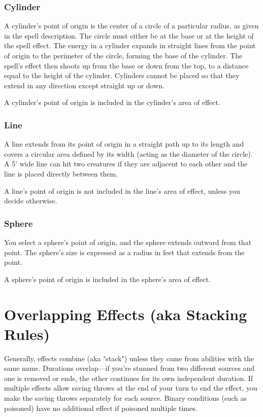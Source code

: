 \subsubsection{Cylinder}

A cylinder's point of origin is the center of a circle of a particular radius, as given in the spell description. The circle must either be at the base or at the height of the spell effect. The energy in a cylinder expands in straight lines from the point of origin to the perimeter of the circle, forming the base of the cylinder. The spell's effect then shoots up from the base or down from the top, to a distance equal to the height of the cylinder. Cylinders cannot be placed so that they extend in any direction except straight up or down.

A cylinder's point of origin is included in the cylinder's area of effect.

\subsubsection{Line}

A line extends from its point of origin in a straight path up to its length and covers a circular area defined by its width (acting as the diameter of the circle). A 5' wide line can hit two creatures if they are adjacent to each other and the line is placed directly between them.

A line's point of origin is not included in the line's area of effect, unless you decide otherwise.

\subsubsection{Sphere}

You select a sphere's point of origin, and the sphere extends outward from that point. The sphere's size is expressed as a radius in feet that extends from the point.

A sphere's point of origin is included in the sphere's area of effect.

\section{Overlapping Effects (aka Stacking Rules)\label{sec:stacking}}
Generally, effects combine (aka "stack") unless they came from abilities with the same name. Durations overlap---if you're stunned from two different sources and one is removed or ends, the other continues for its own independent duration. If multiple effects allow saving throws at the end of your turn to end the effect, you make the saving throws separately for each source. Binary conditions (such as poisoned) have no additional effect if poisoned multiple times.

